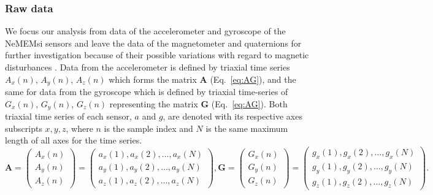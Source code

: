 \documentclass[fleqn,10pt]{wlscirep}
\begin{document}
\subsubsection*{Raw data}
We focus our analysis from data of the 
accelerometer and gyroscope of the NeMEMsi sensors \cite{Comotti2014} and 
leave the data of the magnetometer and quaternions for further investigation 
because of their possible variations with regard to magnetic disturbances \cite{shoaib2016}.
Data from the accelerometer is defined by triaxial time series 
$A_x(n)$, $A_y(n)$, $A_z(n)$ which forms the matrix $\boldsymbol{A}$ 
(Eq.~\ref{eq:AG}), and the same for data from the gyroscope 
which is defined by triaxial time-series of $G_x(n)$, $G_y(n)$, $G_z(n)$ 
representing the matrix $\boldsymbol{G}$ (Eq.~\ref{eq:AG}).
Both triaxial time series of each sensor, $a$ and $g$, are denoted with 
its respective axes subscripts $x,y,z$, where $n$ is the sample index 
and $N$ is the same maximum length of all axes for the time series.
\begin{equation}\label{eq:AG}
\boldsymbol{A} =
\begin{pmatrix}
  A_x(n) \\
  A_y(n) \\
  A_z(n)
\end{pmatrix}
=
\begin{pmatrix}
 a_x(1),a_x(2),\dots,a_x(N) \\
 a_y(1),a_y(2),\dots,a_y(N) \\
 a_z(1),a_z(2),\dots,a_z(N) 
\end{pmatrix},
\boldsymbol{G} =
\begin{pmatrix}
 G_x(n) \\
 G_y(n) \\
 G_z(n)
\end{pmatrix}
=
\begin{pmatrix}
 g_x(1),g_x(2),\dots,g_x(N) \\
 g_y(1),g_y(2),\dots,g_y(N) \\
 g_z(1),g_z(2),\dots,g_z(N) 
\end{pmatrix}.
\end{equation}
\end{document}
